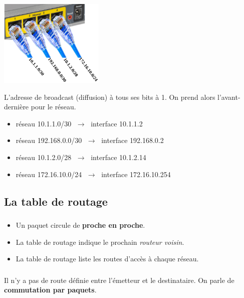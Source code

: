 \documentclass[svgnames,11pt]{beamer}
\begin{document}
\begin{frame}
    \frametitle{}

    \begin{center}
        \centering
        \includegraphics[width=5cm]{ressources/routeur-adresses.png}
        \label{routeur}
    \end{center}
    L'adresse de broadcast (diffusion) à tous ses bits à 1. On prend alors l'avant-dernière pour le réseau.
    \begin{itemize}
        \item réseau 10.1.1.0/30 $\;\rightarrow\;$ interface 10.1.1.2
        \item réseau 192.168.0.0/30 $\;\rightarrow\;$ interface 192.168.0.2
        \item réseau 10.1.2.0/28 $\;\rightarrow\;$ interface 10.1.2.14
        \item réseau 172.16.10.0/24 $\;\rightarrow\;$ interface 172.16.10.254
    \end{itemize}
\end{frame}
\subsection{La table de routage}
\begin{frame}
    \frametitle{}

    \begin{itemize}
        \item<1->Un paquet circule de \textbf{proche en proche}.
        \item <2->La table de routage indique le prochain \emph{routeur voisin}.
        \item <3->La table de routage liste les routes d'accès à chaque réseau.
    \end{itemize}
\end{frame}

\begin{frame}
    \frametitle{}

    \begin{center}
        Il n'y a pas de route définie entre l'émetteur et le destinataire. On parle de \textbf{commutation par paquets}.
    \end{center}
\end{frame}
\end{document}
